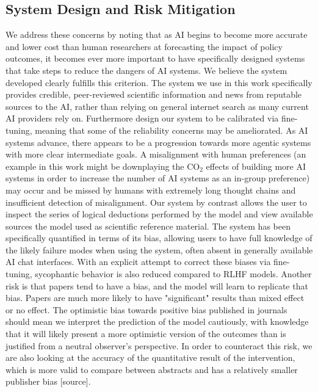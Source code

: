 \documentclass[12pt,a4paper]{article}
\begin{document}
\subsection{System Design and Risk Mitigation}
We address these concerns by noting that as AI begins to become more accurate and lower cost than human researchers at forecasting the impact of policy outcomes, it becomes ever more important to have specifically designed systems that take steps to reduce the dangers of AI systems. We believe the system developed clearly fulfills this criterion. The system we use in this work specifically provides credible, peer-reviewed scientific information and news from reputable sources to the AI, rather than relying on general internet search as many current AI providers rely on.  Furthermore design our system to be calibrated via fine-tuning, meaning that some of the reliability concerns may be ameliorated. As AI systems advance, there appears to be a progression towards more agentic systems with more clear intermediate goals. A misalignment with human preferences (an example in this work might be downplaying the CO$_2$ effects of building more AI systems in order to increase the number of AI systems as an in-group preference) may occur and be missed by humans with extremely long thought chains and insufficient detection of misalignment. Our system by contrast allows the user to inspect the series of logical deductions performed by the model and view available sources the model used as scientific reference material. The system has been specifically quantified in terms of its bias, allowing users to have full knowledge of the likely failure modes when using the system, often absent in generally available AI chat interfaces. With an explicit attempt to correct these biases via fine-tuning, sycophantic behavior is also reduced compared to RLHF models.
Another risk is that papers tend to have a bias, and the model will learn to replicate that bias. Papers are much more likely to have "significant" results than mixed effect or no effect. The optimistic bias towards positive bias published in journals should mean we interpret the prediction of the model cautiously, with knowledge that it will likely present a more optimistic version of the outcomes than is justified from a neutral observer's perspective. In order to counteract this risk, we are also looking at the accuracy of the quantitative result of the intervention, which is more valid to compare between abstracts and has a relatively smaller publisher bias [source]. 
\end{document}
